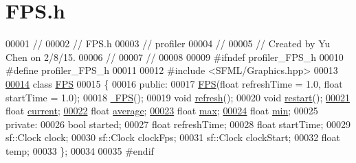 \hypertarget{_f_p_s_8h_source}{}\section{F\+P\+S.\+h}
\label{_f_p_s_8h_source}

\begin{DoxyCode}
00001 \textcolor{comment}{//}
00002 \textcolor{comment}{//  FPS.h}
00003 \textcolor{comment}{//  profiler}
00004 \textcolor{comment}{//}
00005 \textcolor{comment}{//  Created by Yu Chen on 2/8/15.}
00006 \textcolor{comment}{//}
00007 \textcolor{comment}{//}
00008 
00009 \textcolor{preprocessor}{#ifndef profiler\_FPS\_h}
00010 \textcolor{preprocessor}{#define profiler\_FPS\_h}
00011 
00012 \textcolor{preprocessor}{#include <SFML/Graphics.hpp>}
00013 
\hypertarget{_f_p_s_8h_source_l00014}{}\hyperlink{class_f_p_s}{00014} \textcolor{keyword}{class }\hyperlink{class_f_p_s}{FPS}
00015 \{
00016 \textcolor{keyword}{public}:
00017     \hyperlink{class_f_p_s_aa7155cdb7ab1a351ae797f5c137dc39c}{FPS}(\textcolor{keywordtype}{float} refreshTime = 1.0, \textcolor{keywordtype}{float} startTime = 1.0);
00018     \hyperlink{class_f_p_s_ae9c26e732f0773feaacd6c812db04e88}{~FPS}();
00019     \textcolor{keywordtype}{void} \hyperlink{class_f_p_s_aa143312d7f24775fc5d829efa3878c83}{refresh}();
00020     \textcolor{keywordtype}{void} \hyperlink{class_f_p_s_a2804b8d6ff6f3670bc25fbbc53f5e689}{restart}();
\hypertarget{_f_p_s_8h_source_l00021}{}\hyperlink{class_f_p_s_ada217de2ec2b66f8485fdbf70ee33675}{00021}     \textcolor{keywordtype}{float} \hyperlink{class_f_p_s_ada217de2ec2b66f8485fdbf70ee33675}{current};
\hypertarget{_f_p_s_8h_source_l00022}{}\hyperlink{class_f_p_s_a5724af794ec15040b8b101dd0c547893}{00022}     \textcolor{keywordtype}{float} \hyperlink{class_f_p_s_a5724af794ec15040b8b101dd0c547893}{average};
\hypertarget{_f_p_s_8h_source_l00023}{}\hyperlink{class_f_p_s_afdca12a152cef9df305e78d8d05ce518}{00023}     \textcolor{keywordtype}{float} \hyperlink{class_f_p_s_afdca12a152cef9df305e78d8d05ce518}{max};
\hypertarget{_f_p_s_8h_source_l00024}{}\hyperlink{class_f_p_s_af873eaf0d65931baa5f58415f024ccf7}{00024}     \textcolor{keywordtype}{float} \hyperlink{class_f_p_s_af873eaf0d65931baa5f58415f024ccf7}{min};
00025 \textcolor{keyword}{private}:
00026     \textcolor{keywordtype}{bool} started;
00027     \textcolor{keywordtype}{float} refreshTime;
00028     \textcolor{keywordtype}{float} startTime;
00029     sf::Clock clock;
00030     sf::Clock clockFps;
00031     sf::Clock clockStart;
00032     \textcolor{keywordtype}{float} temp;
00033 \};
00034 
00035 \textcolor{preprocessor}{#endif}
\end{DoxyCode}
